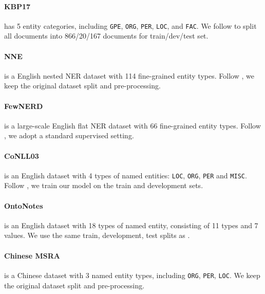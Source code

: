\documentclass[11pt]{article}
\begin{document}
\paragraph{KBP17} \citep{DBLP:conf/tac/JiPZNMMC17} has 5 entity categories, including \texttt{GPE}, \texttt{ORG}, \texttt{PER}, \texttt{LOC}, and \texttt{FAC}. We follow \citet{lin-etal-2019-sequence} to split all documents into 866/20/167 documents for train/dev/test set.

\paragraph{NNE} \citep{ringland-etal-2019-nne} is a English nested NER dataset with 114 fine-grained entity types. Follow \citet{wang-etal-2020-pyramid}, we keep the original dataset split and pre-processing.

\paragraph{FewNERD} \citep{ding-etal-2021-nerd} is a large-scale English flat NER dataset with 66 fine-grained entity types. Follow \citet{ding-etal-2021-nerd}, we adopt a standard supervised setting. 




\paragraph{CoNLL03}  \citep{tjong-kim-sang-de-meulder-2003-introduction} is an English dataset with 4 types of named entities: \texttt{LOC}, \texttt{ORG}, \texttt{PER} and \texttt{MISC}. Follow \citet{yan2021bartner, yu-etal-2020-named}, we train our model on the train and development sets.

\paragraph{OntoNotes} \citep{pradhan-etal-2013-towards} is an English dataset with 18 types of named entity, consisting of 11 types and 7 values. We use the same train, development, test splits as \citet{li-etal-2020-unified}.

\paragraph{Chinese MSRA} \citep{levow-2006-third} is a Chinese dataset with 3 named entity types, including \texttt{ORG}, \texttt{PER}, \texttt{LOC}. We keep the original dataset split and pre-processing.
\end{document}
